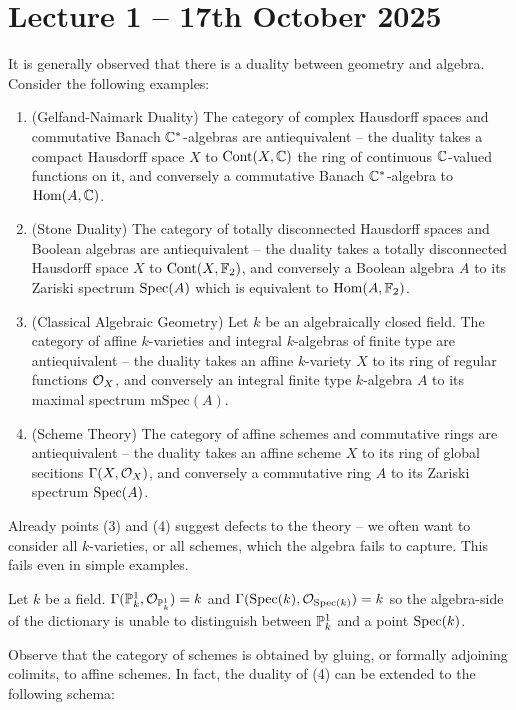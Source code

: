 \section{Lecture 1 -- 17th October 2025}\label{sec: lecture 1}
It is generally observed that there is a duality between geometry and algebra. Consider the following examples: 
\begin{enumerate}
    \item (Gelfand-Naimark Duality) The category of complex Hausdorff spaces and commutative Banach $\mathbb{C}^{*}$-algebras are antiequivalent -- the duality takes a compact Hausdorff space $X$ to $\mathrm{Cont}(X,\mathbb{C})$ the ring of continuous $\mathbb{C}$-valued functions on it, and conversely a commutative Banach $\mathbb{C}^{*}$-algebra to $\mathrm{Hom}(A,\mathbb{C})$. 
    \item (Stone Duality) The category of totally disconnected Hausdorff spaces and Boolean algebras are antiequivalent -- the duality takes a totally disconnected Hausdorff space $X$ to $\mathrm{Cont}(X,\mathbb{F}_{2})$, and conversely a Boolean algebra $A$ to its Zariski spectrum $\operatorname{Spec}(A)$ which is equivalent to $\mathrm{Hom}(A,\mathbb{F}_{2})$.   
    \item (Classical Algebraic Geometry) Let $k$ be an algebraically closed field. The category of affine $k$-varieties and integral $k$-algebras of finite type are antiequivalent -- the duality takes an affine $k$-variety $X$ to its ring of regular functions $\mathcal{O}_{X}$, and conversely an integral finite type $k$-algebra $A$ to its maximal spectrum $\mathrm{mSpec}(A)$. 
    \item (Scheme Theory) The category of affine schemes and commutative rings are antiequivalent -- the duality takes an affine scheme $X$ to its ring of global secitions $\Gamma(X,\mathcal{O}_{X})$, and conversely a commutative ring $A$ to its Zariski spectrum $\operatorname{Spec}(A)$. 
\end{enumerate}
Already points (3) and (4) suggest defects to the theory -- we often want to consider all $k$-varieties, or all schemes, which the algebra fails to capture. This fails even in simple examples. 
\begin{example}\label{ex: P1}
    Let $k$ be a field. $\Gamma(\mathbb{P}^{1}_{k},\mathcal{O}_{\mathbb{P}^{1}_{k}})=k$ and $\Gamma(\operatorname{Spec}(k),\mathcal{O}_{\operatorname{Spec}(k)})=k$ so the algebra-side of the dictionary is unable to distinguish between $\mathbb{P}^{1}_{k}$ and a point $\operatorname{Spec}(k)$. 
\end{example}
Observe that the category of schemes is obtained by gluing, or formally adjoining colimits, to affine schemes. In fact, the duality of (4) can be extended to the following schema:
